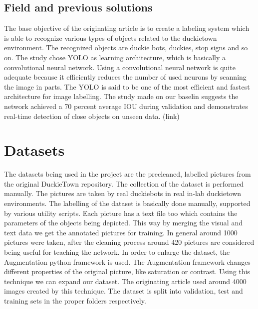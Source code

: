 \documentclass{article}
\begin{document}
\subsection{Field and previous solutions}
The base objective of the originating article is to create a labeling system which is able to recognize various types of objects related to the duckietown environment. The recognized objects are duckie bots, duckies, stop signs and so on. The study chose YOLO as learning architecture, which is basically a convolutional neural network. Using a convolutional neural network is quite adequate because it efficiently reduces the number of used neurons by scanning the image in parts. The YOLO is said to be one of the most efficient and fastest  architecture for image labelling. The study made on our baselin suggests the network achieved a 70 percent average IOU during validation and demonstrates real-time detection of close objects on unseen data. (link)

\section{Datasets}
The datasets being used in the project are the precleaned, labelled pictures from the original DuckieTown repository. The collection of the dataset is performed manually. The pictures are taken by real duckiebots in real in-lab duckietown environments. The labelling of the dataset is basically done manually, supported by various utility scripts. Each picture has a text file too which contains the parameters of the objects being depicted. This way by merging the visual and text data we get the annotated pictures for training. In general around 1000 pictures were taken, after the cleaning process around 420 pictures are considered being useful for teaching the network. In order to enlarge the dataset, the Augmentation python framework is used. The Augmentation framework changes different properties of the original picture, like saturation or contrast. Using this technique we can expand our dataset. The originating article used around 4000 images created by this technique. The dataset is split into validation, test and training sets in the proper folders respectively.
\end{document}
